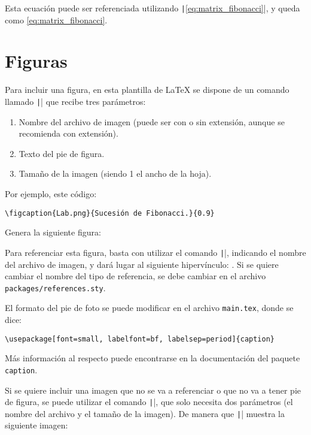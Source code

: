 \documentclass[../main.tex]{subfile}
\begin{document}
    Esta ecuación puede ser referenciada utilizando \texttt|\eqref{eq:matrix_fibonacci}|, y queda como \eqref{eq:matrix_fibonacci}.

  \section{Figuras}

    Para incluir una figura, en esta plantilla de LaTeX se dispone de un comando llamado \texttt|\figcaption| que recibe tres parámetros:

    \begin{enumerate}
      \item Nombre del archivo de imagen (puede ser con o sin extensión, aunque se recomienda con extensión).
      \item Texto del pie de figura.
      \item Tamaño de la imagen (siendo 1 el ancho de la hoja).
    \end{enumerate}

    Por ejemplo, este código:

    \begin{verbatim}
\figcaption{Lab.png}{Sucesión de Fibonacci.}{0.9}
    \end{verbatim}

    Genera la siguiente figura:


    Para referenciar esta figura, basta con utilizar el comando \texttt||, indicando el nombre del archivo de imagen, y dará lugar al siguiente hipervínculo: . Si se quiere cambiar el nombre del tipo de referencia, se debe cambiar en el archivo \texttt{packages/references.sty}.

    El formato del pie de foto se puede modificar en el archivo \texttt{main.tex}, donde se dice:

    \begin{verbatim}
\usepackage[font=small, labelfont=bf, labelsep=period]{caption}
    \end{verbatim}

    Más información al respecto puede encontrarse en la documentación del paquete \texttt{caption}.

    Si se quiere incluir una imagen que no se va a referenciar o que no va a tener pie de figura, se puede utilizar el comando \texttt|\fignocaption|, que solo necesita dos parámetros (el nombre del archivo y el tamaño de la imagen). De manera que \texttt|| muestra la siguiente imagen:
\end{document}
